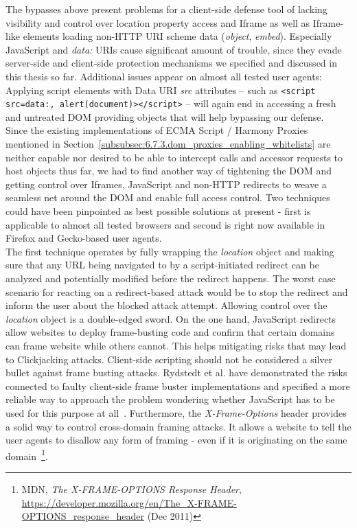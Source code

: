     The bypasses above present problems for a client-side defense tool of lacking visibility and control over location property access and Iframe as well as Iframe-like elements loading non-HTTP URI scheme data (\textit{object}, \textit{embed}). Especially JavaScript and \textit{data:} URIs cause significant amount of trouble, since they evade server-side and client-side protection mechanisms we specified and discussed in this thesis so far. Additional issues appear on almost all tested user agents: Applying script elements with Data URI \textit{src} attributes -- such as \texttt{<script src=data:, alert(document)></script>} -- will again end in accessing a fresh and untreated DOM providing objects that will help bypassing our defense.\\

    Since the existing implementations of ECMA Script / Harmony Proxies mentioned in Section~\ref{subsubsec:6.7.3.dom_proxies_enabling_whitelists} are neither capable nor desired to be able to intercept calls and accessor requests to host objects thus far, we had to find another way of tightening the DOM and getting control over Iframes, JavaScript and non-HTTP redirects to weave a seamless net around the DOM and enable full access control. Two techniques could have been pinpointed as best possible solutions at present - first is applicable to almost all tested browsers and second is right now available in Firefox and Gecko-based user agents. \\

    The first technique operates by fully wrapping the \textit{location} object and making sure that any URL being navigated to by a script-initiated redirect can be analyzed and potentially modified before the redirect happens. The worst case scenario for reacting on a redirect-based attack would be to stop the redirect and inform the user about the blocked attack attempt. Allowing control over the \textit{location} object is a double-edged sword. On the one hand, JavaScript redirects allow websites to deploy frame-busting code and confirm that certain domains can frame website while others cannot. This helps mitigating risks that may lead to Clickjacking attacks. Client-side scripting should not be considered a silver bullet against frame busting attacks. Rydstedt et al. have demonstrated the risks connected to faulty client-side frame buster implementations and specified a more reliable way to approach the problem wondering whether JavaScript has to be used for this purpose at all~\cite{rydstedt_busting_2010}. Furthermore, the \textit{X-Frame-Options} header provides a solid way to control cross-domain framing attacks. It allows a website to tell the user agents to disallow any form of framing - even if it is originating on the same domain~\footnote{MDN, \textit{The X-FRAME-OPTIONS Response Header}, \url{https://developer.mozilla.org/en/The_X-FRAME-OPTIONS_response_header} (Dec 2011)}. \\

